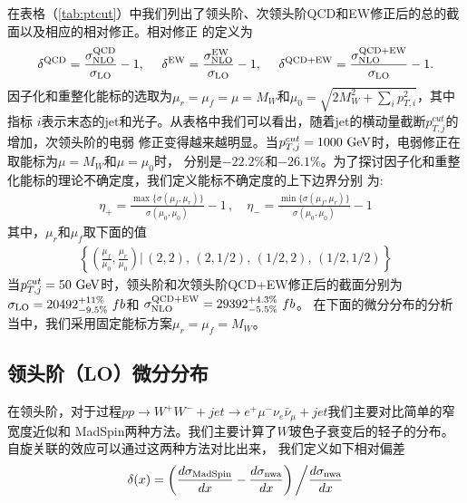 在表格（\ref{tab:ptcut}）中我们列出了领头阶、次领头阶QCD和EW修正后的总的截面以及相应的相对修正。相对修正
的定义为
\begin{eqnarray}
\delta^{{\rm QCD}} = \frac{\sigma^{{\rm QCD}}_{{\rm NLO}}}{\sigma_{{\rm LO}}} - 1,~~~~
\delta^{{\rm EW}} = \frac{\sigma^{{\rm EW}}_{{\rm NLO}}}{\sigma_{{\rm LO}}} - 1,~~~~
\delta^{{\rm QCD + EW}} = \frac{\sigma^{{\rm QCD + EW}}_{{\rm NLO}}}{\sigma_{{\rm LO}}} -1.
\end{eqnarray}
因子化和重整化能标的选取为$\mu_r = \mu_f = \mu = M_W$和$\mu_0 = \sqrt{2M^2_W+\sum_i p^2_{T,i}}$，其中指标
$i$表示末态的jet和光子。从表格中我们可以看出，随着jet的横动量截断$p^{cut}_{T,j}$的增加，次领头阶的电弱
修正变得越来越明显。当$p^{cut}_{T,j} = 1000~\rm{GeV}$时，电弱修正在取能标为$\mu = M_W$和$\mu = \mu_0$时，
分别是$-22.2\%$和$-26.1\%$。为了探讨因子化和重整化能标的理论不确定度，我们定义能标不确定度的上下边界分别
为:
\begin{eqnarray}
\eta_+ = \frac{\max\{\sigma(\mu_f,\mu_r)\}}{\sigma(\mu_0,\mu_0)}-1\, , \quad
\eta_- = \frac{\min\{\sigma(\mu_f,\mu_r)\}}{\sigma(\mu_0,\mu_0)}-1
\end{eqnarray}
其中，$\mu_r$和$\mu_f$取下面的值
\begin{eqnarray}
\left\{
\left( \frac{\mu_f}{\mu_0}, \frac{\mu_r}{\mu_0} \right)
\biggl| \,
\left( 2, 2 \right), \,
\left( 2, 1/2 \right), \,
\left( 1/2, 2 \right), \,
\left( 1/2, 1/2 \right)
\right\}
\end{eqnarray}
当$p^{cut}_{T,j} = 50~\rm{GeV}$时，领头阶和次领头阶QCD+EW修正后的截面分别为
$\sigma_{{\rm LO}} = 20492^{+11\%}_{-9.5\%}~fb$和
$\sigma_{{\rm NLO}}^{{\rm QCD + EW}} = 29392^{+4.3\%}_{-5.5\%}~fb$。
在下面的微分分布的分析当中，我们采用固定能标方案$\mu_r = \mu_f = M_W$。


\subsection{领头阶（LO）微分分布}
在领头阶，对于过程$pp\to W^+W^-+jet\to e^+\mu^-\nu_e\bar{\nu}_{\mu}+jet$我们主要对比简单的窄宽度近似和
MadSpin两种方法。我们主要计算了$W$玻色子衰变后的轻子的分布。自旋关联的效应可以通过这两种方法对比出来，
我们定义如下相对偏差
\begin{eqnarray}
\delta(x) = \left( \frac{d\sigma_{\rm MadSpin}}{dx} - \frac{d\sigma_{\rm nwa}}{dx} \right)\biggl/\frac{d\sigma_{\rm nwa}}{dx}
\end{eqnarray}

